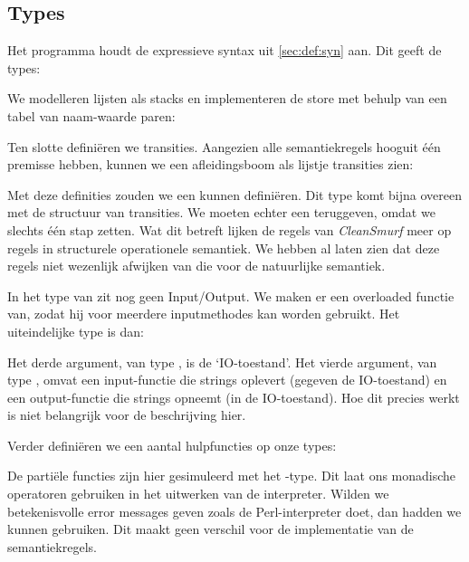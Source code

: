 \subsection{Types}
\label{sec:cleansmurf:types}
Het programma houdt de expressieve syntax uit \autoref{sec:def:syn} aan. Dit
geeft de types:



We modelleren lijsten als stacks en implementeren de store met behulp van een
tabel van naam-waarde paren:



Ten slotte definiëren we transities. Aangezien alle semantiekregels hooguit één
premisse hebben, kunnen we een afleidingsboom als lijstje transities zien:



Met deze definities zouden we een  kunnen definiëren. Dit type komt bijna overeen met de structuur van
transities. We moeten echter een  teruggeven, omdat we slechts één
stap zetten. Wat dit betreft lijken de regels van \emph{CleanSmurf} meer op
regels in structurele operationele semantiek. We hebben al laten zien dat deze
regels niet wezenlijk afwijken van die voor de natuurlijke semantiek.

In het type van  zit nog geen Input/Output. We maken er een overloaded
functie van, zodat hij voor meerdere inputmethodes kan worden gebruikt. Het
uiteindelijke type is dan:



Het derde argument, van type , is de `IO-toestand'. Het vierde argument,
van type , omvat een input-functie die strings oplevert (gegeven de
IO-toestand) en een output-functie die strings opneemt (in de IO-toestand). Hoe
dit precies werkt is niet belangrijk voor de beschrijving hier.

\medskip
Verder definiëren we een aantal hulpfuncties op onze types:



De partiële functies zijn hier gesimuleerd met het -type. Dit laat
ons monadische operatoren gebruiken in het uitwerken van de interpreter. Wilden
we betekenisvolle error messages geven zoals de Perl-interpreter doet, dan
hadden we  kunnen gebruiken. Dit maakt geen verschil voor de
implementatie van de semantiekregels.
